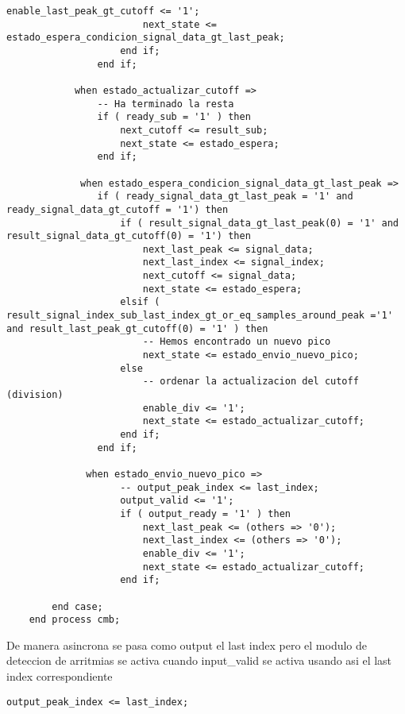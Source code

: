 \begin{lstlisting}[frame=single]
                        enable_last_peak_gt_cutoff <= '1';
                        next_state <= estado_espera_condicion_signal_data_gt_last_peak;
                    end if;
                end if;
                
            when estado_actualizar_cutoff =>
                -- Ha terminado la resta
                if ( ready_sub = '1' ) then
                    next_cutoff <= result_sub;
                    next_state <= estado_espera;
                end if;                
                
             when estado_espera_condicion_signal_data_gt_last_peak =>
                if ( ready_signal_data_gt_last_peak = '1' and ready_signal_data_gt_cutoff = '1') then
                    if ( result_signal_data_gt_last_peak(0) = '1' and result_signal_data_gt_cutoff(0) = '1') then
                        next_last_peak <= signal_data;
                        next_last_index <= signal_index;
                        next_cutoff <= signal_data;
                        next_state <= estado_espera;
                    elsif ( result_signal_index_sub_last_index_gt_or_eq_samples_around_peak ='1' and result_last_peak_gt_cutoff(0) = '1' ) then                     
                        -- Hemos encontrado un nuevo pico
                        next_state <= estado_envio_nuevo_pico;
                    else
                        -- ordenar la actualizacion del cutoff (division)
                        enable_div <= '1';
                        next_state <= estado_actualizar_cutoff;
                    end if;
                end if;
                
              when estado_envio_nuevo_pico =>
                    -- output_peak_index <= last_index;
                    output_valid <= '1';
                    if ( output_ready = '1' ) then
                        next_last_peak <= (others => '0');
                        next_last_index <= (others => '0');
                        enable_div <= '1';
                        next_state <= estado_actualizar_cutoff;
                    end if;
                
        end case;
    end process cmb;
\end{lstlisting}

De manera asincrona se pasa como output el last index pero el modulo de deteccion de arritmias se activa cuando input\_valid
se activa usando asi el last index correspondiente 
\lstset{language=VHDL, breaklines=true, basicstyle=\footnotesize}
\begin{lstlisting}[frame=single]
    output_peak_index <= last_index;
\end{lstlisting}

